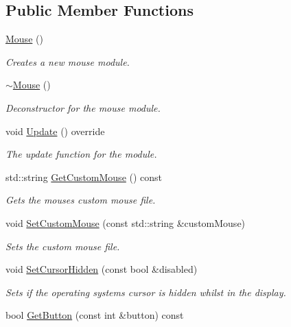 \subsection*{Public Member Functions}
\begin{DoxyCompactItemize}
\item 
\hyperlink{class_flounder_1_1_mouse_a774ae57e1baf480bff486393af1eaca6}{Mouse} ()
\begin{DoxyCompactList}\small\item\em Creates a new mouse module. \end{DoxyCompactList}\item 
\hyperlink{class_flounder_1_1_mouse_a4511fba832387f2406fface9b5e3a383}{$\sim$\+Mouse} ()
\begin{DoxyCompactList}\small\item\em Deconstructor for the mouse module. \end{DoxyCompactList}\item 
void \hyperlink{class_flounder_1_1_mouse_a4fb0490c519e9cecccc6ef8357983025}{Update} () override
\begin{DoxyCompactList}\small\item\em The update function for the module. \end{DoxyCompactList}\item 
std\+::string \hyperlink{class_flounder_1_1_mouse_a4854cfce7fb9b2322d275c38d671a38b}{Get\+Custom\+Mouse} () const
\begin{DoxyCompactList}\small\item\em Gets the mouses custom mouse file. \end{DoxyCompactList}\item 
void \hyperlink{class_flounder_1_1_mouse_a41ee0200977c94e336d39cc7c8d5220b}{Set\+Custom\+Mouse} (const std\+::string \&custom\+Mouse)
\begin{DoxyCompactList}\small\item\em Sets the custom mouse file. \end{DoxyCompactList}\item 
void \hyperlink{class_flounder_1_1_mouse_ae4155725ab7ffe123e58f006116c9e1c}{Set\+Cursor\+Hidden} (const bool \&disabled)
\begin{DoxyCompactList}\small\item\em Sets if the operating systems cursor is hidden whilst in the display. \end{DoxyCompactList}\item 
bool \hyperlink{class_flounder_1_1_mouse_af5b6662f025bb838baca473855444db1}{Get\+Button} (const int \&button) const

\end{DoxyCompactItemize}
